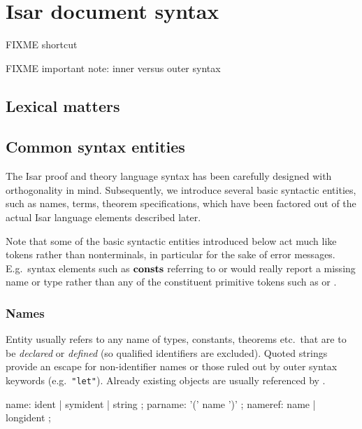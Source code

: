 


\chapter{Isar document syntax}

FIXME shortcut

FIXME important note: inner versus outer syntax

\section{Lexical matters}

\section{Common syntax entities}

The Isar proof and theory language syntax has been carefully designed with
orthogonality in mind.  Subsequently, we introduce several basic syntactic
entities, such as names, terms, theorem specifications, which have been
factored out of the actual Isar language elements described later.

Note that some of the basic syntactic entities introduced below act much like
tokens rather than nonterminals, in particular for the sake of error messages.
E.g.\ syntax elements such as ${\mathord{\mathbf{consts}}}$ referring to  or
 would really report a missing name or type rather than any
of the constituent primitive tokens such as  or
.


\subsection{Names}

Entity  usually refers to any name of types, constants,
theorems etc.\ that are to be \emph{declared} or \emph{defined} (so qualified
identifiers are excluded).  Quoted strings provide an escape for
non-identifier names or those ruled out by outer syntax keywords (e.g.\ 
\verb|"let"|).  Already existing objects are usually referenced by
\railqtoken{nameref}.

\begin{rail}
  name: ident | symident | string
  ;
  parname: '(' name ')'
  ;
  nameref: name | longident
  ;
\end{rail}


